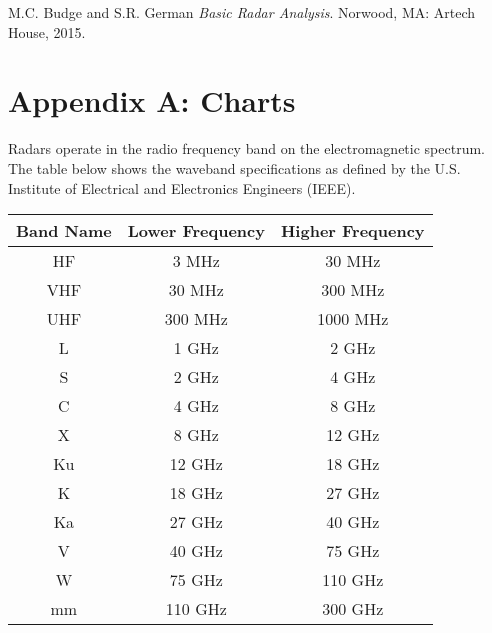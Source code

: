 \documentclass[12pt]{article}
\begin{document}


\pagebreak
\begin{thebibliography}{9}
     M.C. Budge and S.R. German \textit{Basic Radar Analysis}. Norwood, MA: Artech House, 2015.
\end{thebibliography}

\pagebreak
\section{Appendix A: Charts}
Radars operate in the radio frequency band on the electromagnetic spectrum. The table below shows the waveband specifications as defined by the U.S. Institute of Electrical and Electronics Engineers (IEEE).
\begin{center}
    \begin{tabular}{ |c|c|c| }
        \hline
            Band Name & Lower Frequency & Higher Frequency \\
        \hline
        \hline
            HF & 3 MHz & 30 MHz \\
            VHF & 30 MHz & 300 MHz \\
            UHF & 300 MHz & 1000 MHz \\
            L & 1 GHz & 2 GHz \\
            S & 2 GHz & 4 GHz \\
            C & 4 GHz & 8 GHz \\
            X & 8 GHz & 12 GHz \\
            Ku & 12 GHz & 18 GHz \\
            K & 18 GHz & 27 GHz \\
            Ka & 27 GHz & 40 GHz \\
            V & 40 GHz & 75 GHz \\
            W & 75 GHz & 110 GHz \\
            mm & 110 GHz & 300 GHz \\
        \hline
    \end{tabular}
\end{center}
\end{document}
